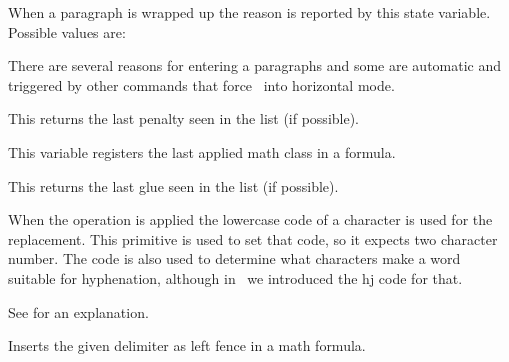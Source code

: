 \stopnewprimitive

\startnewprimitive[title={\prm {lastparcontext}}]

When a paragraph is wrapped up the reason is reported by this state variable.
Possible values are:

\startfourrows
{}
\stopfourrows

\stopnewprimitive

\startnewprimitive[title={\prm {lastpartrigger}}]

There are several reasons for entering a paragraphs and some are automatic and
triggered by other commands that force \TEX\ into horizontal mode.

\startfourrows
{}
\stopfourrows

\stopnewprimitive

\startoldprimitive[title={\prm {lastpenalty}}]

This returns the last penalty seen in the list (if possible).

\stopoldprimitive

\startnewprimitive[title={\prm {lastrightclass}}]

This variable registers the last applied math class in a formula.

\stopnewprimitive

\startoldprimitive[title={\prm {lastskip}}]

This returns the last glue seen in the list (if possible).

\stopoldprimitive

\startoldprimitive[title={\prm {lccode}}]

When the  operation is applied the lowercase code of a character
is used for the replacement. This primitive is used to set that code, so it
expects two character number. The code is also used to determine what characters
make a word suitable for hyphenation, although in \LUATEX\ we introduced the \prm
{hj} code for that.

\stopoldprimitive

\startoldprimitive[title={\prm {leaders}}]

See  for an explanation.

\stopoldprimitive

\startoldprimitive[title={\prm {left}}]

Inserts the given delimiter as left fence in a math formula.

\stopoldprimitive

